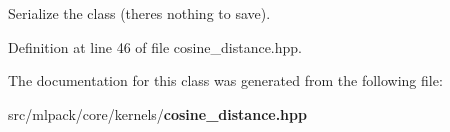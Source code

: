 Serialize the class (there\textquotesingle{}s nothing to save). 



Definition at line 46 of file cosine\+\_\+distance.\+hpp.



The documentation for this class was generated from the following file\+:\begin{DoxyCompactItemize}
\item 
src/mlpack/core/kernels/{\bf cosine\+\_\+distance.\+hpp}\end{DoxyCompactItemize}
